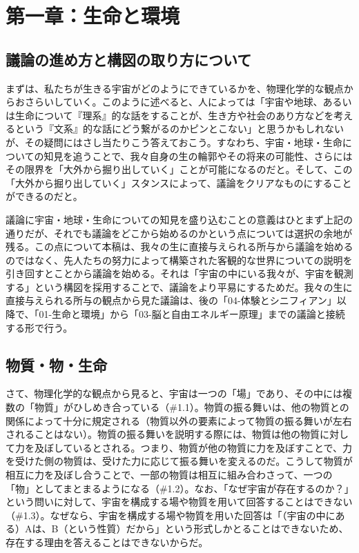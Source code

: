 \section{第一章：生命と環境}\label{ux7b2cux4e00ux7ae0ux751fux547dux3068ux74b0ux5883}

\subsection{議論の進め方と構図の取り方について}\label{ux8b70ux8ad6ux306eux9032ux3081ux65b9ux3068ux69cbux56f3ux306eux53d6ux308aux65b9ux306bux3064ux3044ux3066}

まずは、私たちが生きる宇宙がどのようにできているかを、物理化学的な観点からおさらいしていく。このように述べると、人によっては「宇宙や地球、あるいは生命について『理系』的な話をすることが、生き方や社会のあり方などを考えるという『文系』的な話にどう繋がるのかピンとこない」と思うかもしれないが、その疑問にはさし当たりこう答えておこう。すなわち、宇宙・地球・生命についての知見を追うことで、我々自身の生の輪郭やその将来の可能性、さらにはその限界を「大外から掘り出していく」ことが可能になるのだと。そして、この「大外から掘り出していく」スタンスによって、議論をクリアなものにすることができるのだと。

議論に宇宙・地球・生命についての知見を盛り込むことの意義はひとまず上記の通りだが、それでも議論をどこから始めるのかという点については選択の余地が残る。この点について本稿は、我々の生に直接与えられる所与から議論を始めるのではなく、先人たちの努力によって構築された客観的な世界についての説明を引き回すとことから議論を始める。それは「宇宙の中にいる我々が、宇宙を観測する」という構図を採用することで、議論をより平易にするためだ。我々の生に直接与えられる所与の観点から見た議論は、後の「04-体験とシニフィアン」以降で、「01-生命と環境」から「03-脳と自由エネルギー原理」までの議論と接続する形で行う。

\subsection{物質・物・生命}\label{ux7269ux8ceaux7269ux751fux547d}

さて、物理化学的な観点から見ると、宇宙は一つの「場」であり、その中には複数の「物質」がひしめき合っている（\#1.1）。物質の振る舞いは、他の物質との関係によって十分に規定される（物質以外の要素によって物質の振る舞いが左右されることはない）。物質の振る舞いを説明する際には、物質は他の物質に対して力を及ぼしているとされる。つまり、物質が他の物質に力を及ぼすことで、力を受けた側の物質は、受けた力に応じて振る舞いを変えるのだ。こうして物質が相互に力を及ぼし合うことで、一部の物質は相互に組み合わさって、一つの「物」としてまとまるようになる（\#1.2）。なお、「なぜ宇宙が存在するのか？」という問いに対して、宇宙を構成する場や物質を用いて回答することはできない（\#1.3）。なぜなら、宇宙を構成する場や物質を用いた回答は「（宇宙の中にある）Aは、B（という性質）だから」という形式しかとることはできないため、存在する理由を答えることはできないからだ。

